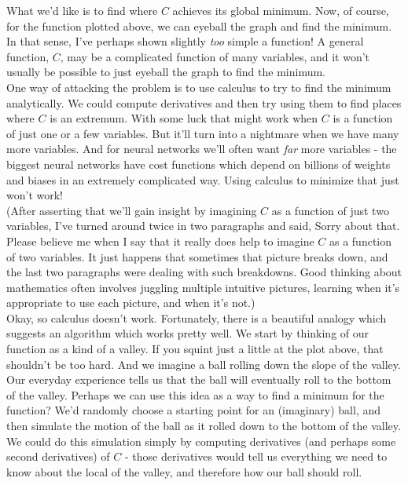 What we'd like is to find where $C$ achieves its global minimum. Now, of course, for the function plotted above, we can eyeball the graph and find the minimum. In that sense, I've perhaps shown slightly \textit{too} simple a function! A general function, $C$, may be a complicated function of many variables, and it won't usually be possible to just eyeball the graph to find the minimum.\\

One way of attacking the problem is to use calculus to try to find the minimum analytically. We could compute derivatives and then try using them to find places where $C$ is an extremum. With some luck that might work when $C$ is a function of just one or a few variables. But it'll turn into a nightmare when we have many more variables. And for neural networks we'll often want \textit{far} more variables - the biggest neural networks have cost functions which depend on billions of weights and biases in an extremely complicated way. Using calculus to minimize that just won't work!\\

(After asserting that we'll gain insight by imagining $C$ as a function of just two variables, I've turned around twice in two paragraphs and said,  Sorry about that. Please believe me when I say that it really does help to imagine $C$ as a function of two variables. It just happens that sometimes that picture breaks down, and the last two paragraphs were dealing with such breakdowns. Good thinking about mathematics often involves juggling multiple intuitive pictures, learning when it's appropriate to use each picture, and when it's not.)\\

Okay, so calculus doesn't work. Fortunately, there is a beautiful analogy which suggests an algorithm which works pretty well. We start by thinking of our function as a kind of a valley. If you squint just a little at the plot above, that shouldn't be too hard. And we imagine a ball rolling down the slope of the valley. Our everyday experience tells us that the ball will eventually roll to the bottom of the valley. Perhaps we can use this idea as a way to find a minimum for the function? We'd randomly choose a starting point for an (imaginary) ball, and then simulate the motion of the ball as it rolled down to the bottom of the valley. We could do this simulation simply by computing derivatives (and perhaps some second derivatives) of $C$ - those derivatives would tell us everything we need to know about the local  of the valley, and therefore how our ball should roll.\\

